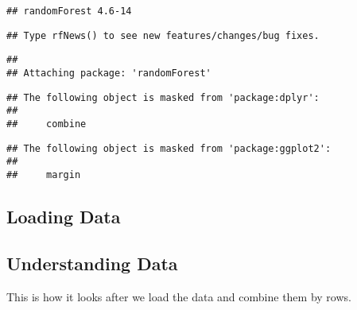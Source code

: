 \documentclass[]{article}
\newenvironment{Shaded}{\begin{snugshade}}{\end{snugshade}}
\newcommand{\KeywordTok}[1]{\textcolor[rgb]{0.13,0.29,0.53}{\textbf{#1}}}
\newcommand{\DataTypeTok}[1]{\textcolor[rgb]{0.13,0.29,0.53}{#1}}
\newcommand{\StringTok}[1]{\textcolor[rgb]{0.31,0.60,0.02}{#1}}
\newcommand{\OtherTok}[1]{\textcolor[rgb]{0.56,0.35,0.01}{#1}}
\newcommand{\OperatorTok}[1]{\textcolor[rgb]{0.81,0.36,0.00}{\textbf{#1}}}
\newcommand{\NormalTok}[1]{#1}
\begin{document}
\begin{verbatim}
## randomForest 4.6-14
\end{verbatim}

\begin{verbatim}
## Type rfNews() to see new features/changes/bug fixes.
\end{verbatim}

\begin{verbatim}
## 
## Attaching package: 'randomForest'
\end{verbatim}

\begin{verbatim}
## The following object is masked from 'package:dplyr':
## 
##     combine
\end{verbatim}

\begin{verbatim}
## The following object is masked from 'package:ggplot2':
## 
##     margin
\end{verbatim}

\subsection{Loading Data}\label{loading-data}

\begin{Shaded}
\end{Shaded}

\subsection{Understanding Data}\label{understanding-data}

This is how it looks after we load the data and combine them by rows.
\end{document}
